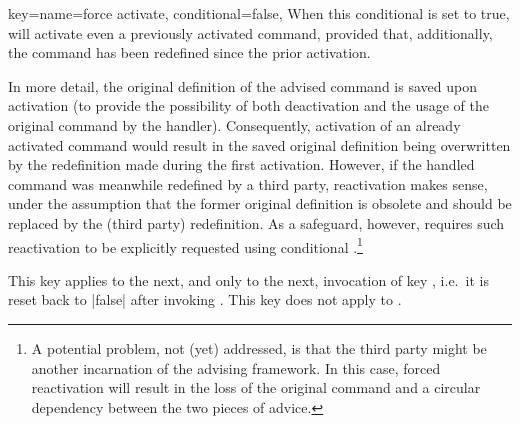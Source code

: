 \documentclass[a4paper,11pt]{article}
\begin{document}
\begin{doc}{
    key={name=force activate, conditional=false},
  }
  When this conditional is set to true,  will activate even a
  previously activated command, provided that, additionally, the command has
  been redefined since the prior activation.

  In more detail, the original definition of the advised command is saved upon
  activation (to provide the possibility of both deactivation and the usage of
  the original command by the handler).  Consequently, activation of an already
  activated command would result in the saved original definition being
  overwritten by the redefinition made during the first activation.  However,
  if the handled command was meanwhile redefined by a third party, reactivation
  makes sense, under the assumption that the former original definition is
  obsolete and should be replaced by the (third party) redefinition.  As a
  safeguard, however,  requires such reactivation to be
  explicitly requested using conditional .\footnote{A
    potential problem, not (yet) addressed, is that the third party might be
    another incarnation of the advising framework.  In this case, forced
    reactivation will result in the loss of the original command and a circular
    dependency between the two pieces of advice.}
  
  This key applies to the next, and only to the next, invocation of key
  , i.e.\ it is reset back to |false| after invoking
  .  This key does not apply to .
\end{doc}
\end{document}
